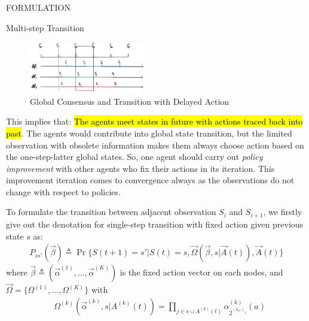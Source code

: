 \documentclass[10pt, conference, letterpaper]{IEEEtran}
\begin{document}
\begin{section}{FORMULATION}
\begin{subsection}{Multi-step Transition}
            \begin{figure}[h]
                \centering
                \includegraphics[width=0.45\textwidth]{broadcast-trans.png}
                \caption{Global Consensus and Transition with Delayed Action}
                \label{fig:br-trans}
            \end{figure}

            This implies that: \hl{The agents meet states in future with actions traced back into past}. The agents would contribute into global state transition, but the limited observation with obsolete information makes them always choose action based on the one-step-latter global states. So, one agent should carry out \emph{policy improvement} with other agents who fix their actions in its iteration. This improvement iteration comes to convergence always as the observations do not change with respect to policies.

            To formulate the transition between adjacent observation $S_i$ and $S_{i+1}$, we firstly give out the denotation for single-step transition with fixed action given previous state $s$ as:
            \begin{align}
                P_{ss'}(\vec{\beta}) \triangleq \Pr\{ S(t+1)=s'|S(t)=s, \vec{\Omega}(\vec{\beta},s|\vec{A}(t)),\vec{A}(t) \}
            \end{align}
            where $\vec{\beta} \triangleq (\vec{\alpha}^{(1)}, \dots, \vec{\alpha}^{(K)})$ is the fixed action vector on each nodes, and $\vec{\Omega}=\{\Omega^{(1)},\dots,\Omega^{(K)}\}$ with
            \begin{align}
                &\Omega^{(k)}(\vec{\alpha}^{(k)},s|A^{(k)}(t)) 
                = \prod_{j \in s \cup A^{(k)}(t)} \alpha_{2^{(L_C)_j}}^{(k)}(a)
            \end{align}
                

\end{subsection}
\end{section}
\end{document}
